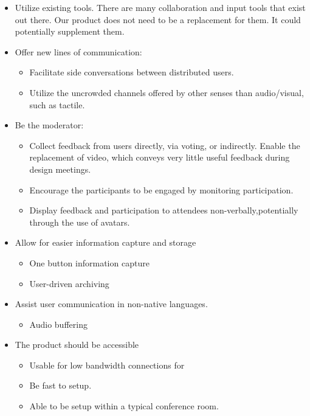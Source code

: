 \begin{itemize}\tightlist
\item Utilize existing tools. There are many collaboration and input  tools that exist out there. Our product does not need to be a replacement for them. It could potentially supplement them.
\item Offer new lines of communication:
        \begin{itemize}\tightlist
                \item Facilitate side conversations between distributed users.
                \item Utilize the uncrowded channels offered by other senses than audio/visual, such as tactile.
\end{itemize}
\newpage
\item Be the moderator: 
\begin{itemize}\tightlist
                \item Collect feedback from users directly, via voting, or indirectly. Enable the replacement of video, which conveys very little useful feedback during design meetings.
                \item Encourage the participants to be engaged by monitoring participation.
                \item Display feedback and participation to attendees non-verbally,potentially through the use of avatars.      
\end{itemize}
\item Allow for easier information capture and storage
\begin{itemize}\tightlist
                \item One button information capture
                \item User-driven archiving
\end{itemize}
\item Assist user communication in non-native languages.
        \begin{itemize}\tightlist
                \item Audio buffering
 \end{itemize}
\item The product should be accessible
\begin{itemize}\tightlist
\item Usable for low bandwidth connections for 
\item Be fast to setup.
\item Able to be setup within a typical conference room.
\end{itemize}
\end {itemize}

